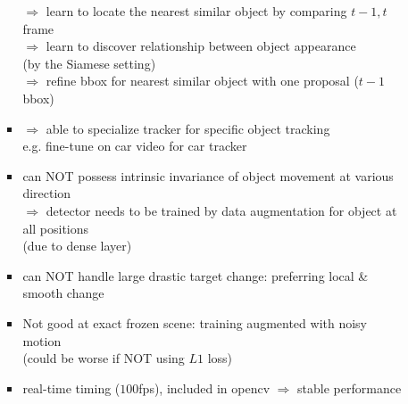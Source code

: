 \begin{itemize}
\begin{itemize}
\begin{itemize}
		$\Rightarrow$ learn to locate the nearest similar object by comparing $t-1,t$ frame \\
		$\Rightarrow$ learn to discover relationship between object appearance \\ 
		(by the Siamese setting) \\
		$\Rightarrow$ refine bbox for nearest similar object with one proposal ($t-1$ bbox)
		\item $\Rightarrow$ able to specialize tracker for specific object tracking \\
		e.g. fine-tune on car video for car tracker
		\item can NOT possess intrinsic invariance of object movement at various direction \\
		$\Rightarrow$ detector needs to be trained by data augmentation for object at all positions \\
		(due to dense layer)
		\item can NOT handle large drastic target change: preferring local \& smooth change 
		\item Not good at exact frozen scene: training augmented with noisy motion \\
		(could be worse if NOT using $L1$ loss)
		\item real-time timing ($100$fps), included in opencv $\Rightarrow$ stable performance
		\end{itemize}
	\end{itemize}


\end{itemize}

